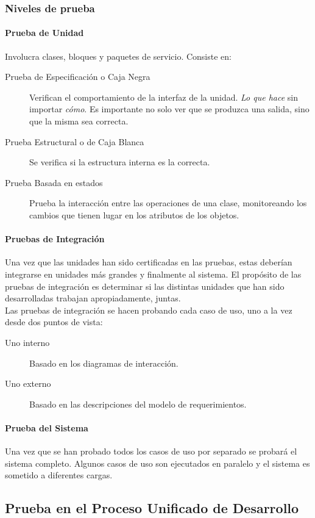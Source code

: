 \subsubsection{Niveles de prueba}
\paragraph{Prueba de Unidad}
Involucra clases, bloques y paquetes de servicio. Consiste en:
\begin{description}
	\item[Prueba de Especificación o Caja Negra] Verifican el comportamiento de la interfaz de la unidad. \emph{Lo que hace} sin importar \emph{cómo}. Es importante no solo ver que se produzca una salida, sino que la misma sea correcta.
	\item[Prueba Estructural o de Caja Blanca] Se verifica si la estructura interna es la correcta.
	\item[Prueba Basada en estados] Prueba la interacción entre las operaciones de una clase, monitoreando los cambios que tienen lugar en los atributos de los objetos.
\end{description}
\paragraph{Pruebas de Integración}
Una vez que las unidades han sido certificadas en las pruebas, estas deberían integrarse en unidades más grandes y finalmente al sistema. El propósito de las pruebas de integración es determinar si las distintas unidades que han sido desarrolladas trabajan apropiadamente, juntas.\\
Las pruebas de integración se hacen probando cada caso de uso, uno a la vez desde dos puntos de vista:
\begin{description}
	\item[Uno interno] Basado en los diagramas de interacción.
	\item[Uno externo] Basado en las descripciones del modelo de requerimientos.
\end{description}
\paragraph{Prueba del Sistema}
Una vez que se han probado todos los casos de uso por separado se probará el sistema completo. Algunos casos de uso son ejecutados en paralelo y el sistema es sometido a diferentes cargas.
\subsection{Prueba en el Proceso Unificado de Desarrollo}
